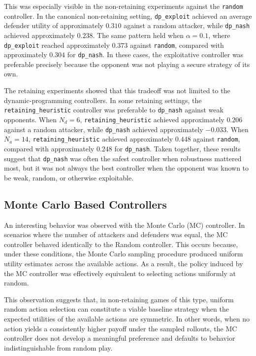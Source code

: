 \documentclass[letterpaper, 10 pt, conference]{ieeeconf}  %
\begin{document}
This was especially visible in the non-retaining experiments against the \texttt{random} controller. In the canonical non-retaining setting, \texttt{dp\_exploit} achieved an average defender utility of approximately $0.310$ against a random attacker, while \texttt{dp\_nash} achieved approximately $0.238$. The same pattern held when $\alpha = 0.1$, where \texttt{dp\_exploit} reached approximately $0.373$ against \texttt{random}, compared with approximately $0.304$ for \texttt{dp\_nash}. In these cases, the exploitative controller was preferable precisely because the opponent was not playing a secure strategy of its own.

The retaining experiments showed that this tradeoff was not limited to the dynamic-programming controllers. In some retaining settings, the \texttt{retaining\_heuristic} controller was preferable to \texttt{dp\_nash} against weak opponents. When $N_d = 6$, \texttt{retaining\_heuristic} achieved approximately $0.206$ against a random attacker, while \texttt{dp\_nash} achieved approximately $-0.033$. When $N_a = 14$, \texttt{retaining\_heuristic} achieved approximately $0.448$ against \texttt{random}, compared with approximately $0.248$ for \texttt{dp\_nash}. Taken together, these results suggest that \texttt{dp\_nash} was often the safest controller when robustness mattered most, but it was not always the best controller when the opponent was known to be weak, random, or otherwise exploitable.

\subsection{Monte Carlo Based Controllers}
An interesting behavior was observed with the Monte Carlo (MC) controller. In scenarios where the number of attackers and defenders was equal, the MC controller behaved identically to the Random controller. This occurs because, under these conditions, the Monte Carlo sampling procedure produced uniform utility estimates across the available actions. As a result, the policy induced by the MC controller was effectively equivalent to selecting actions uniformly at random.

This observation suggests that, in non-retaining games of this type, uniform random action selection can constitute a viable baseline strategy when the expected utilities of the available actions are symmetric. In other words, when no action yields a consistently higher payoff under the sampled rollouts, the MC controller does not develop a meaningful preference and defaults to behavior indistinguishable from random play.
\end{document}
